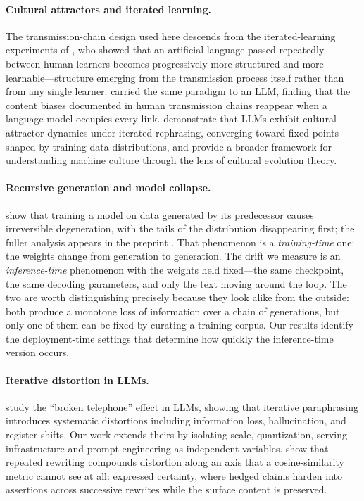 \documentclass[11pt]{article}
\begin{document}
\paragraph{Cultural attractors and iterated learning.}
The transmission-chain design used here descends from the iterated-learning
experiments of \citet{kirby2008cumulative}, who showed that an artificial
language passed repeatedly between human learners becomes progressively more
structured and more learnable---structure emerging from the transmission process
itself rather than from any single learner. \citet{acerbi2023content} carried the
same paradigm to an LLM, finding that the content biases documented in human
transmission chains reappear when a language model occupies every link.
\citet{perez2025cultural} demonstrate that LLMs exhibit cultural attractor dynamics
under iterated rephrasing, converging toward fixed points shaped by training data
distributions, and \citet{brinkmann2023machine} provide a broader framework for
understanding machine culture through the lens of cultural evolution theory.

\paragraph{Recursive generation and model collapse.}
\citet{shumailov2024collapse} show that training a model on data generated by its
predecessor causes irreversible degeneration, with the tails of the distribution
disappearing first; the fuller analysis appears in the preprint
\citep{shumailov2023curse}. That phenomenon is a \emph{training-time} one: the
weights change from generation to generation. The drift we measure is an
\emph{inference-time} phenomenon with the weights held fixed---the same
checkpoint, the same decoding parameters, and only the text moving around the
loop. The two are worth distinguishing precisely because they look alike from the
outside: both produce a monotone loss of information over a chain of generations,
but only one of them can be fixed by curating a training corpus. Our results
identify the deployment-time settings that determine how quickly the
inference-time version occurs.

\paragraph{Iterative distortion in LLMs.}
\citet{mohamed2025broken} study the ``broken telephone'' effect in LLMs, showing
that iterative paraphrasing introduces systematic distortions including information
loss, hallucination, and register shifts. Our work extends theirs by isolating
scale, quantization, serving infrastructure and prompt engineering as independent
variables. \citet{belem2026certainty} show that repeated rewriting compounds
distortion along an axis that a cosine-similarity metric cannot see at all:
expressed certainty, where hedged claims harden into assertions across successive
rewrites while the surface content is preserved.
\end{document}
